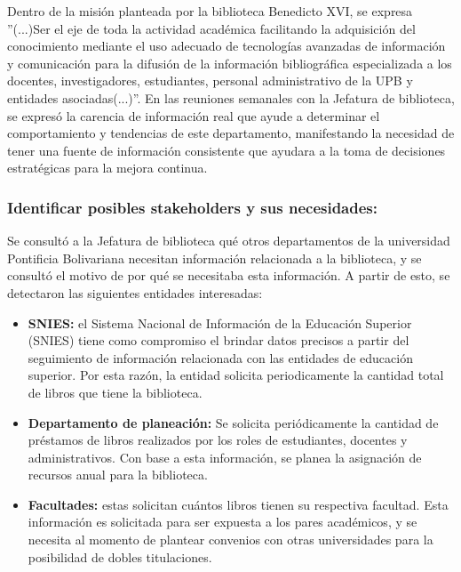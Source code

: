 \documentclass[spanish]{ieee_upb}
\begin{document}
\vspace{0.3cm}
Dentro de la misión planteada por la biblioteca Benedicto XVI, se expresa ''(...)Ser el eje de toda la actividad académica facilitando la adquisición del conocimiento mediante el uso adecuado de tecnologías avanzadas de información y comunicación para la difusión de la información bibliográfica especializada a los docentes, investigadores, estudiantes, personal administrativo de la UPB y entidades asociadas(...)''\cite{UPB_Biblioteca}. En las reuniones semanales con la Jefatura de biblioteca, se expresó la carencia de información real que ayude a determinar el comportamiento y tendencias de este departamento, manifestando la necesidad de tener una fuente de información consistente que ayudara a la toma de decisiones estratégicas para la mejora continua.

\vspace{0.3cm}
\subsubsection{Identificar posibles stakeholders y sus necesidades: }

Se consultó a la Jefatura de biblioteca qué otros departamentos de la universidad Pontificia Bolivariana necesitan información relacionada a la biblioteca, y se consultó el motivo de por qué se necesitaba esta información. A partir de esto, se detectaron las siguientes entidades interesadas:

\begin{itemize}
    \item \textbf{SNIES: }el Sistema Nacional de Información de la Educación Superior (SNIES) tiene como compromiso el brindar datos precisos a partir del seguimiento de información relacionada con las entidades de educación superior\cite{MEN2024_SIES_EEES2023}. Por esta razón, la entidad solicita periodicamente la cantidad total de libros que tiene la biblioteca. 

    \item \textbf{Departamento de planeación: } 
    Se solicita periódicamente la cantidad de préstamos de libros realizados por los roles de estudiantes, docentes y administrativos. Con base a esta información, se planea la asignación de recursos anual para la biblioteca. 

    \item \textbf{Facultades: }estas solicitan cuántos libros tienen su respectiva facultad. Esta información es solicitada para ser expuesta a los pares académicos, y se necesita al momento de plantear convenios con otras universidades para la posibilidad de dobles titulaciones.
    
\end{itemize}
\end{document}
